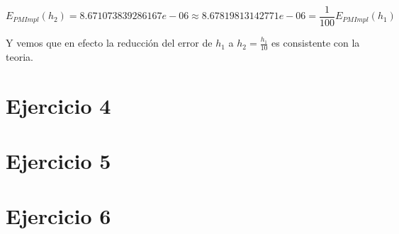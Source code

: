 \documentclass[11pt]{article}
\begin{document}
\[ E_{PMImpl}(h_2)=8.671073839286167e−06 \approx 8.67819813142771e−06= \frac{1}{100}E_{PMImpl}(h_1) \]

Y vemos que en efecto la reducción del error de \(h_1\) a \(h_2=\frac{h_1}{10}\) es consistente con la teoria.

\section*{Ejercicio 4}



\section*{Ejercicio 5}



\section*{Ejercicio 6}



    
    
    
    
\end{document}
